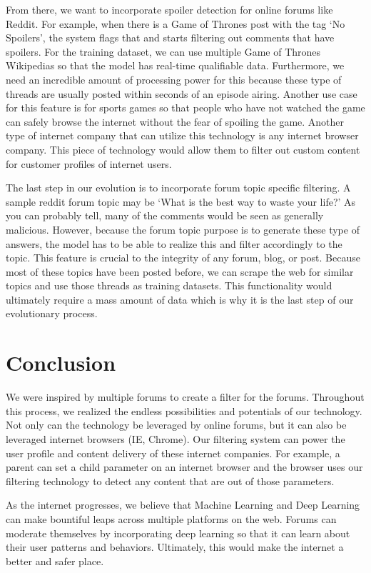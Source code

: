 \documentclass{article}
\begin{document}
From there, we want to incorporate spoiler detection for online forums like Reddit. For example, when there is a Game of Thrones post with the tag ‘No Spoilers’, the system flags that and starts filtering out comments that have spoilers. For the training dataset, we can use multiple Game of Thrones Wikipedias so that the model has real-time qualifiable data. Furthermore, we need an incredible amount of processing power for this because these type of threads are usually posted within seconds of an episode airing. Another use case for this feature is for sports games so that people who have not watched the game can safely browse the internet without the fear of spoiling the game. Another type of internet company that can utilize this technology is any internet browser company. This piece of technology would allow them to filter out custom content for customer profiles of internet users.

The last step in our evolution is to incorporate forum topic specific filtering. A sample reddit forum topic may be ‘What is the best way to waste your life?’ As you can probably tell, many of the comments would be seen as generally malicious. However, because the forum topic purpose is to generate these type of answers, the model has to be able to realize this and filter accordingly to the topic. This feature is crucial to the integrity of any forum, blog, or post. Because most of these topics have been posted before, we can scrape the web for similar topics and use those threads as training datasets. This functionality would ultimately require a mass amount of data which is why it is the last step of our evolutionary process. 

\section{Conclusion}
We were inspired by multiple forums to create a filter for the forums. Throughout this process, we realized the endless possibilities and potentials of our technology. Not only can the technology be leveraged by online forums, but it can also be leveraged internet browsers (IE, Chrome). Our filtering system can power the user profile and content delivery of these internet companies. For example, a parent can set a child parameter on an internet browser and the browser uses our filtering technology to detect any content that are out of those parameters. 

As the internet progresses, we believe that Machine Learning and Deep Learning can make bountiful leaps across multiple platforms on the web. Forums can moderate themselves by incorporating deep learning so that it can learn about their user patterns and behaviors. Ultimately, this would make the internet a better and safer place. 
\end{document}
